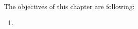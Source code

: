 \chapter{}

\label{Chapter5} %


The objectives of this chapter are following:

\begin{enumerate}
\item     
\end{enumerate}

